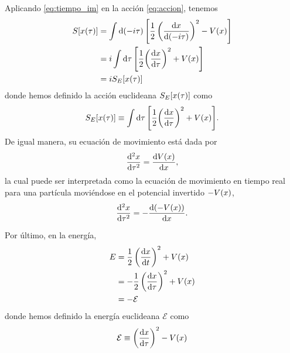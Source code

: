 Aplicando \eqref{eq:tiempo_im} en la acción \eqref{eq:accion}, tenemos
\begin{align}
S\qty[x\qty(\tau)] &= \int \dd{\qty(-i\tau)} \qty[ \frac{1}{2} \left(\dv{x}{\qty(-i\tau)}\right)^2 - V(x)] \\
&= i \int \dd{\tau} \qty[ \frac{1}{2}\qty(\dv{x}{\tau})^2 + V(x)] \\
&= iS_E\qty[x\qty(\tau)] \label{eq:S_s_e}
\end{align}
donde hemos definido la acción euclideana $S_E\qty[x\qty(\tau)]$ como 
\begin{equation}\label{eq:eucliaction}
S_E\qty[x\qty(\tau)] \equiv \int \dd{\tau} \qty[ \frac{1}{2}\qty(\dv{x}{\tau})^2 + V(x)].
\end{equation}
De igual manera, su ecuación de movimiento está dada por
\begin{equation}\label{eq:mov_ec}
\dv[2]{x}{\tau} = \dv{V(x)}{x},
\end{equation}
la cual puede ser interpretada como la ecuación de movimiento en tiempo real para una partícula moviéndose en el potencial invertido $-V\qty(x)$,
\begin{equation}
\dv[2]{x}{\tau} = -\dv{\qty(-V(x))}{x}.
\end{equation}
 
Por último, en la energía, 
\begin{align}
	E &= \frac{1}{2} \left(\dv{x}{t}\right)^2 + V\qty(x) \\
	&= -\frac{1}{2} \left(\dv{x}{\tau}\right)^2 + V\qty(x) \\
	&= -\mathcal{E}
\end{align}
donde hemos definido la energía euclideana $\mathcal{E}$ como \cite{rubakov2009classical}
\begin{equation} \label{eq:E_eucli}
	\mathcal{E}  \equiv \left(\dv{x}{\tau}\right)^2 - V\qty(x)
\end{equation}


